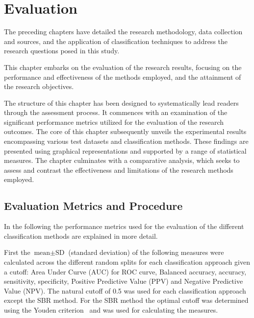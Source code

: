 \section{Evaluation}
\label{sec:evaluation}

The preceding chapters have detailed the research methodology, data collection and sources, and the application of classification techniques 
to address the research questions posed in this study. 

This chapter embarks on the evaluation of the research results, focusing on the performance and effectiveness of the methods employed, 
and the attainment of the research objectives.

The structure of this chapter has been designed to systematically lead readers through the assessment process. 
It commences with an examination of the significant performance metrics utilized for the evaluation of 
the research outcomes.
The core of this chapter subsequently unveils the experimental results encompassing various test datasets 
and classification methods. 
These findings are presented using graphical representations and supported by a range of statistical measures.
The chapter culminates with a comparative analysis, which seeks to assess and contrast the effectiveness and 
limitations of the research methods employed.


\subsection{Evaluation Metrics and Procedure}
\label{subsec:determinationInconcl}

In the following the performance metrics used for the evaluation of the different classification methods 
are explained in more detail.

First the $\text{mean} \pm \text{SD}$ (standard deviation) of the following measures were calculated across
the different random splits for each classification approach given a cutoff: 
Area Under Curve (AUC) for ROC curve, Balanced accuracy, accuracy, sensitivity, specificity, 
Positive Predictive Value (PPV) and Negative Predictive Value (NPV).
The natural cutoff of 0.5 was used for each classification approach except the SBR method.
For the SBR method the optimal cutoff was determined using the Youden criterion~\citep{Youden1950} and was used for
calculating the measures.

